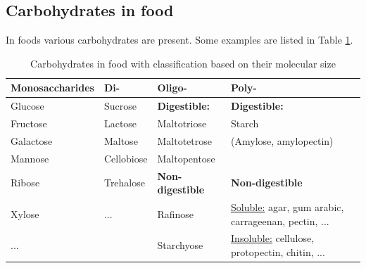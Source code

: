 \subsection*{Carbohydrates in food}
In foods various carbohydrates are present. Some examples are listed in Table \ref{tab:L02_carbohydrates}.
\begin{table}[ht]
    \centering
    \caption{Carbohydrates in food with classification based on their molecular size}
    \label{tab:L02_carbohydrates}
    \begin{tabular}{l|l|l|l}
    \textbf{Monosaccharides} & \textbf{Di-} & \textbf{Oligo-} & \textbf{Poly-} \\
    \hline
    Glucose & Sucrose & \textbf{Digestible:} & \textbf{Digestible:} \\

    Fructose & Lactose & Maltotriose & Starch \\

    Galactose & Maltose & Maltotetrose & (Amylose, amylopectin) \\

    Mannose & Cellobiose & Maltopentose & \\

    Ribose & Trehalose & \textbf{Non-digestible} & \textbf{Non-digestible} \\

    Xylose & ... & Rafinose & \underline{Soluble:} agar, gum arabic, carrageenan, pectin, ... \\
    ... & & Starchyose & \underline{Insoluble:} cellulose, protopectin, chitin, ... \\
    \end{tabular}
\end{table}

